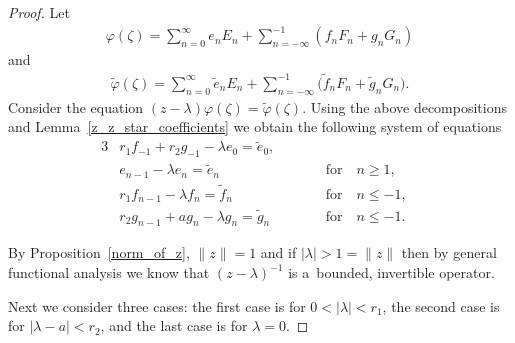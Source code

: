 \begin{proof}
Let
\begin{gather*}
\varphi(\zeta)=\sum\limits_{n=0}^\infty e_n E_n+\sum\limits_{n=-\infty}^{-1}(f_nF_n+g_nG_n)
\end{gather*}
and
\begin{gather*}
\tilde{\varphi}(\zeta)=\sum\limits_{n=0}^\infty \tilde{e}_n E_n+\sum\limits_{n=-\infty}^{-1}\big(\tilde{f}_nF_n+\tilde{g}_nG_n\big).
\end{gather*}
Consider the equation $(z-\lambda)\varphi(\zeta)=\tilde{\varphi}(\zeta)$.
Using the above decompositions and Lemma~\ref{z_z_star_coefficients} we obtain the following system of equations
\begin{alignat}{3}
&  r_1f_{-1}+r_2g_{-1}-\lambda e_0=\tilde{e}_0,\qquad &&&\nonumber
\\
& e_{n-1}-\lambda e_n=\tilde{e}_n \quad &&\text{for} \quad n\ge1, &\nonumber
\\
& r_1f_{n-1}-\lambda f_n=\tilde{f}_n \quad &&\text{for} \quad n\le-1,&\nonumber
\\
 & r_2g_{n-1}+ag_n-\lambda g_n=\tilde{g}_n \quad &&\text{for} \quad  n\le-1. & \label{resolvent_system}
\end{alignat}

By Proposition~\ref{norm_of_z}, $\|z\|=1$ and if $|\lambda|>1=\|z\|$ then by general functional analysis we know that
$(z-\lambda)^{-1}$ is a~bounded, invertible operator.

Next we consider three cases: the f\/irst case is for $0<|\lambda|<r_1$, the second case is for $|\lambda-a|<r_2$, and the
last case is for $\lambda=0$.


\end{proof}
